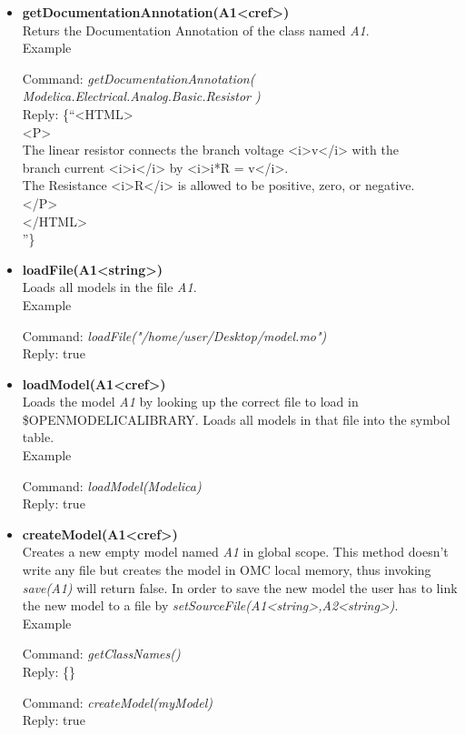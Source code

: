 \documentclass[11pt,a4paper,oneside,english]{book}
\newenvironment{modelicaExamples}{\begin{itemize}}{\end{itemize}}
\newcommand{\api}[2]{\item \textbf{#1} \\ #2}
\newcommand{\command}[1]{Command: \textit{#1}\\}
\newcommand{\reply}[1]{Reply: #1}
\newcommand{\functionex}[2]{\begin{singlespace} \command{#1} \reply{#2} \end{singlespace}}
\newcommand{\examples}{Example}
\begin{document}
\begin{modelicaExamples}
{		\functionex{getDiagramAnnotation(Modelica.Electrical.Analog.Basic.Re\-si\-stor)}
		{\begin{scriptsize}\{-100.0, -100.0, 100.0, 100.0, \{Rectangle (true, \{0, 0, 255\},
\{0,0,0\}, LinePattern.Solid, FillPattern.None, 0.25, BorderPattern.None, \{\{-70.0,30.0\},
\{70.0,-30.0\}\}, 0.0), Line (true, \{\{-96.0,0.0\}, \{-70.0, 0.0\}\}, \{0,0,255\}, LinePattern.Solid, 0.25,
\{Arrow.None,Arrow.None\}, 3.0, false), Line(true, \{\{70.0,0.0\}, \{96.0,0.0\}\},
\{0,0,255\}, LinePattern.Solid,0.25,
\{Arrow.None,Arrow.None\}, 3.0, false)\}\}
		\end{scriptsize}}
		}

		\api{getDocumentationAnnotation(A1<cref>)}{Returs the Documentation Annotation of the class named \textit{A1}.\\
		\examples
		\functionex{getDocumentationAnnotation( Modelica.Electrical.Analog.Ba\-sic.Re\-sistor )}
		{\{``<HTML>\\
		<P>\\
		The linear resistor connects the branch voltage <i>v</i> with the\\
		branch current <i>i</i> by <i>i*R = v</i>.\\
		The Resistance <i>R</i> is allowed to be positive, zero, or negative.\\
		</P>\\
		</HTML>\\
		''\}}
		}

		\api{loadFile(A1<string>)}{Loads all models in the file \textit{A1}.\\
		\examples
		\functionex{loadFile("/home/user/Desktop/model.mo")}
		{true}
		}

		\api{loadModel(A1<cref>)}{Loads the model \textit{A1} by looking up the correct file to load in                   \$OPENMODELICALIBRARY. Loads all models in that file into the symbol table.\\
		\examples
		\functionex{loadModel(Modelica)}
		{true}
		}

		\api{createModel(A1<cref>)}{Creates a new empty model named \textit{A1} in global scope.
		This method doesn't write any file but creates the model in OMC local memory, thus invoking \textit{save(A1)} will return false. In order to save the new model the user has to link the new model to a file by \textit{setSourceFile(A1<string>,A2<string>)}.\\
		\examples
		\functionex{getClassNames()}
		{\{\}}

		\functionex{createModel(myModel)}
		{true}

}
\end{modelicaExamples}
\end{document}
